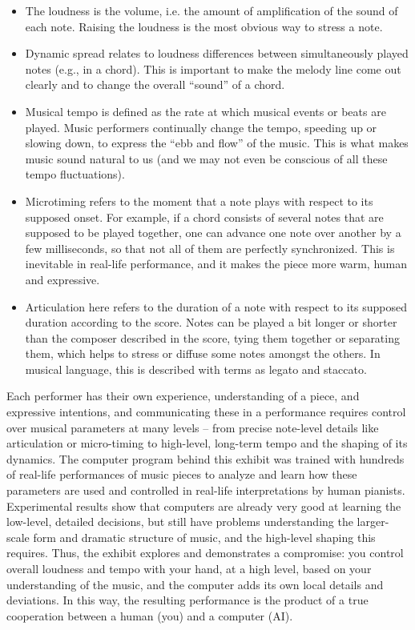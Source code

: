 \begin{itemize}
\item The loudness is the volume, i.e. the amount of amplification of the sound of each note. Raising the loudness is the most obvious way to stress a note.
 
\item Dynamic spread relates to loudness differences between simultaneously played notes (e.g., in a chord). This is important to make the melody line come out clearly and to change the overall ``sound'' of a chord.

\item Musical tempo is defined as the rate at which musical events or beats are played. Music performers continually change the tempo, speeding up or slowing down, to express the ``ebb and flow'' of the music. This is what makes music sound natural to us (and we may not even be conscious of all these tempo fluctuations).

\item Microtiming refers to the moment that a note plays with respect to its supposed onset. For example, if a chord consists of several notes that are supposed to be played together, one can advance one note over another by a few milliseconds, so that not all of them are perfectly synchronized. This is inevitable in real-life performance, and it makes the piece more warm, human and expressive.

\item Articulation here refers to the duration of a note with respect to its supposed duration according to the score. Notes can be played a bit longer or shorter than the composer described in the score, tying them together or separating them, which helps to stress or diffuse some notes amongst the others. In musical language, this is described with terms as legato and staccato.
\end{itemize}

Each performer has their own experience, understanding of a piece, and expressive intentions, and communicating these in a performance requires control over musical parameters at many levels -- from precise note-level details like articulation or micro-timing to high-level, long-term tempo and the shaping of its dynamics. The computer program behind this exhibit was trained with hundreds of real-life performances of music pieces to analyze and learn how these parameters are used and controlled in real-life interpretations by human pianists. Experimental results show that computers are already very good at learning the low-level, detailed decisions, but still have problems understanding the larger-scale form and dramatic structure of music, and the high-level shaping this requires. Thus, the exhibit explores and demonstrates a compromise: you control overall loudness and tempo with your hand, at a high level, based on your understanding of the music, and the computer adds its own local details and deviations. In this way, the resulting performance is the product of a true cooperation between a human (you) and a computer (AI).

